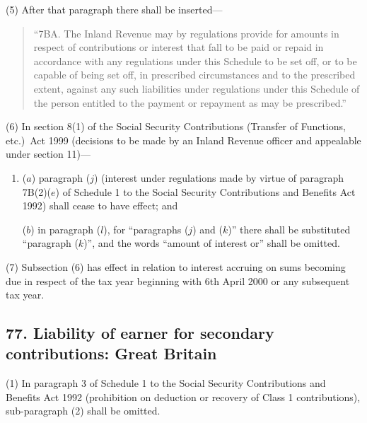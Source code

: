 \documentclass[12pt,a4paper]{article}
\begin{document}
(5) After that paragraph there shall be inserted—
\begin{quotation}
“7BA. The Inland Revenue may by regulations provide for amounts in respect of contributions or interest that fall to be paid or repaid in accordance with any regulations under this Schedule to be set off, or to be capable of being set off, in prescribed circumstances and to the prescribed extent, against any such liabilities under regulations under this Schedule of the person entitled to the payment or repayment as may be prescribed.”
\end{quotation}

(6) In section 8(1)  of the Social Security Contributions (Transfer of Functions, etc.)\ Act 1999 (decisions to be made by an Inland Revenue officer and appealable under section 11)—
\begin{enumerate}\item[]
($a$) paragraph ($j$)  (interest under regulations made by virtue of paragraph 7B(2)($e$)  of Schedule 1 to the Social Security Contributions and Benefits Act 1992) shall cease to have effect; and

($b$) in paragraph ($l$), for “paragraphs ($j$)  and ($k$)” there shall be substituted “paragraph ($k$)”, and the words “amount of interest or” shall be omitted.
\end{enumerate}

(7) Subsection (6)  has effect in relation to interest accruing on sums becoming due in respect of the tax year beginning with 6th April 2000 or any subsequent tax year.

\subsection{77. Liability of earner for secondary contributions: Great Britain}

(1) In paragraph 3 of Schedule 1 to the Social Security Contributions and Benefits Act 1992 (prohibition on deduction or recovery of Class 1 contributions), sub-paragraph (2)  shall be omitted.
\end{document}
